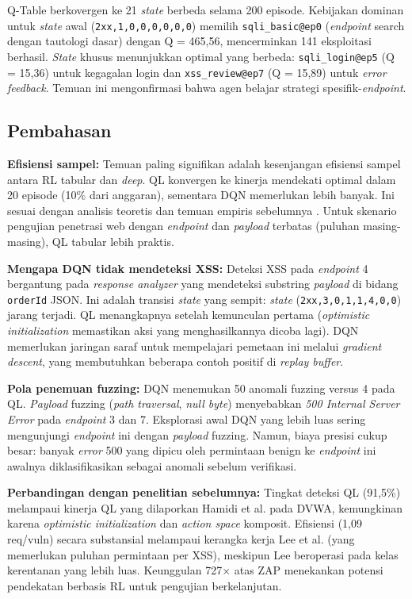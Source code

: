 \documentclass[a4paper,12pt]{article}
\begin{document}
Q-Table berkovergen ke 21 \textit{state} berbeda selama 200 episode. Kebijakan dominan untuk \textit{state} awal (\texttt{2xx,1,0,0,0,0,0,0}) memilih \texttt{sqli\_basic@ep0} (\textit{endpoint} search dengan tautologi dasar) dengan Q = 465,56, mencerminkan 141 eksploitasi berhasil. \textit{State} khusus menunjukkan optimal yang berbeda: \texttt{sqli\_login@ep5} (Q = 15,36) untuk kegagalan login dan \texttt{xss\_review@ep7} (Q = 15,89) untuk \textit{error} \textit{feedback}. Temuan ini mengonfirmasi bahwa agen belajar strategi spesifik-\textit{endpoint}.

\subsection{Pembahasan}

\textbf{Efisiensi sampel:} Temuan paling signifikan adalah kesenjangan efisiensi sampel antara RL tabular dan \textit{deep}. QL konvergen ke kinerja mendekati optimal dalam 20 episode (10\% dari anggaran), sementara DQN memerlukan lebih banyak. Ini sesuai dengan analisis teoretis \cite{sutton2018} dan temuan empiris sebelumnya \cite{hamidi2023}. Untuk skenario pengujian penetrasi web dengan \textit{endpoint} dan \textit{payload} terbatas (puluhan masing-masing), QL tabular lebih praktis.

\textbf{Mengapa DQN tidak mendeteksi XSS:} Deteksi XSS pada \textit{endpoint} 4 bergantung pada \textit{response analyzer} yang mendeteksi substring \textit{payload} di bidang \texttt{orderId} JSON. Ini adalah transisi \textit{state} yang sempit: \textit{state} (\texttt{2xx,3,0,1,1,4,0,0}) jarang terjadi. QL menangkapnya setelah kemunculan pertama (\textit{optimistic initialization} memastikan aksi yang menghasilkannya dicoba lagi). DQN memerlukan jaringan saraf untuk mempelajari pemetaan ini melalui \textit{gradient descent}, yang membutuhkan beberapa contoh positif di \textit{replay buffer}.

\textbf{Pola penemuan fuzzing:} DQN menemukan 50 anomali fuzzing versus 4 pada QL. \textit{Payload} fuzzing (\textit{path traversal}, \textit{null byte}) menyebabkan \textit{500 Internal Server Error} pada \textit{endpoint} 3 dan 7. Eksplorasi awal DQN yang lebih luas sering mengunjungi \textit{endpoint} ini dengan \textit{payload} fuzzing. Namun, biaya presisi cukup besar: banyak \textit{error} 500 yang dipicu oleh permintaan benign ke \textit{endpoint} ini awalnya diklasifikasikan sebagai anomali sebelum verifikasi.

\textbf{Perbandingan dengan penelitian sebelumnya:} Tingkat deteksi QL (91,5\%) melampaui kinerja QL yang dilaporkan Hamidi et al. \cite{hamidi2023} pada DVWA, kemungkinan karena \textit{optimistic initialization} dan \textit{action space} komposit. Efisiensi (1,09 req/vuln) secara substansial melampaui kerangka kerja Lee et al. \cite{lee2022} (yang memerlukan puluhan permintaan per XSS), meskipun Lee beroperasi pada kelas kerentanan yang lebih luas. Keunggulan 727$\times$ atas ZAP menekankan potensi pendekatan berbasis RL untuk pengujian berkelanjutan.
\end{document}
